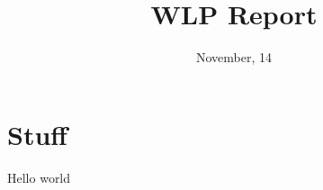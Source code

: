 \documentclass[a4paper]{article}
\title{WLP Report}
\date{November, 14}
\begin{document}
\section{Stuff}
Hello world
\end{document}
